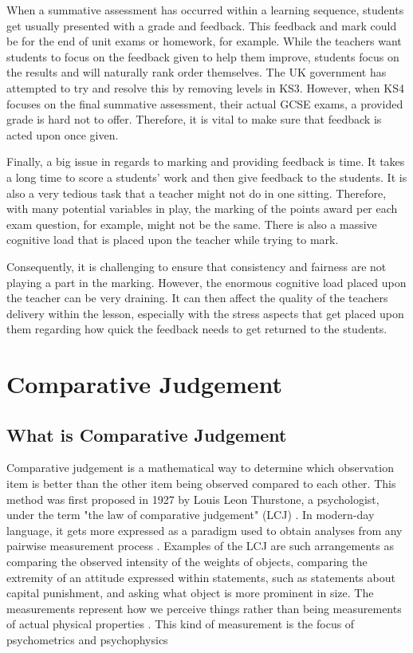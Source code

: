 		When a summative assessment has occurred within a learning sequence, students get usually presented with a grade and feedback. This feedback and mark could be for the end of unit exams or homework, for example. While the teachers want students to focus on the feedback given to help them improve, students focus on the results and will naturally rank order themselves. The UK government has attempted to try and resolve this by removing levels in KS3. However, when KS4 focuses on the final summative assessment, their actual GCSE exams, a provided grade is hard not to offer. Therefore, it is vital to make sure that feedback is acted upon once given.
		
		Finally, a big issue in regards to marking and providing feedback is time. It takes a long time to score a students' work and then give feedback to the students. It is also a very tedious task that a teacher might not do in one sitting. Therefore, with many potential variables in play, the marking of the points award per each exam question, for example, might not be the same. There is also a massive cognitive load that is placed upon the teacher while trying to mark.
		
		Consequently, it is challenging to ensure that consistency and fairness are not playing a part in the marking. However, the enormous cognitive load placed upon the teacher can be very draining. It can then affect the quality of the teachers delivery within the lesson, especially with the stress aspects that get placed upon them regarding how quick the feedback needs to get returned to the students.
	
	\section{Comparative Judgement}
	
	
	\subsection{What is Comparative Judgement} 
		Comparative judgement is a mathematical way to determine which observation item is better than the other item being observed compared to each other. This method was first proposed in 1927 by Louis Leon Thurstone, a psychologist, under the term "the law of comparative judgement" (LCJ) \cite{thurstone1927psychophysical, thurstone1927law}. In modern-day language, it gets more expressed as a paradigm used to obtain analyses from any pairwise measurement process \cite{research_ed}. Examples of the LCJ are such arrangements as comparing the observed intensity of the weights of objects, comparing the extremity of an attitude expressed within statements, such as statements about capital punishment, and asking what object is more prominent in size.  The measurements represent how we perceive things rather than being measurements of actual physical properties \cite{arbuckle1973general}. This kind of measurement is the focus of psychometrics and psychophysics \cite{furr2021psychometrics, gescheider2013psychophysics}
		
